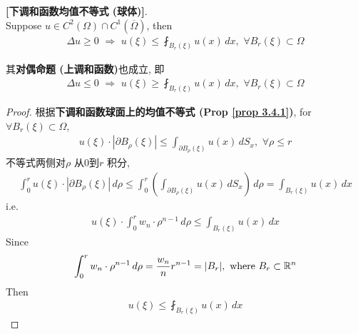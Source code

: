 	\begin{corollary}\label{cor 3.4.1}
		\textbf{[下调和函数均值不等式 (球体)]}. \\
		Suppose $u \in C^2(\Omega) \cap C^1 \left( \overline{\Omega} \right)$, then
		\begin{align*}
			\Delta u \geq 0 \,\, \Rightarrow \,\, u(\xi) \leq \fint_{B_{r}(\xi)} u(x) \, dx , \,\, \forall B_{r}(\xi) \subset \Omega
		\end{align*}
		
		\vspace{4em}
		
		\begin{rmk}
			其\textbf{对偶命题 (上调和函数)}也成立, 即
			\begin{align*}
				\Delta u \leq 0 \,\, \Rightarrow \,\, u(\xi) \geq \fint_{B_{r}(\xi)} u(x) \, dx , \,\, \forall B_{r}(\xi) \subset \Omega
			\end{align*}
		\end{rmk}
		
		\vspace{6em}
		
		\begin{proof}
			根据\textbf{下调和函数球面上的均值不等式 (Prop \ref{prop 3.4.1})}, for $\forall B_{r}(\xi) \subset \Omega$, 
			\begin{align*}
				u(\xi) \cdot \left| \partial B_{\rho}(\xi) \right| 
				\leq \int_{\partial B_{\rho}(\xi)} u(x) \, dS_x , \,\, \forall \rho \leq r
			\end{align*}
			不等式两侧对$\rho$ 从0到$r$ 积分, 
			\begin{align*}
				\int_{0}^r u(\xi) \cdot \left| \partial B_{\rho}(\xi) \right| \, d\rho 
				\leq \int_{0}^r \left( \int_{\partial B_{\rho}(\xi)} u(x) \, dS_x \right) \, d\rho 
				= \int_{B_{r}(\xi)} u(x) \, dx
			\end{align*}
			i.e.
			\begin{align*}
				u(\xi) \cdot \int_{0}^r w_n \cdot \rho^{n - 1} \, d\rho 
				\leq \int_{B_{r}(\xi)} u(x) \, dx
			\end{align*}
			Since 
			\begin{align*}
				\int_{0}^r w_n \cdot \rho^{n - 1} \, d\rho 
				= \frac{w_n}{n} r^{n - 1} 
				= | B_r | , \,\, \text{where} \,\, B_{r} \subset \mathbb{R}^n
			\end{align*}
			Then
			\begin{align*}
				u(\xi) \leq \fint_{B_{r}(\xi)} u(x) \, dx
			\end{align*}
		\end{proof}
	\end{corollary}

